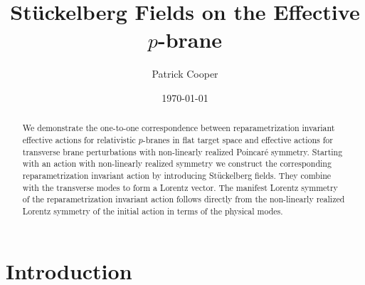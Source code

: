 \documentclass[%
 reprint,
 amsmath,amssymb,
 aps,
]{revtex4-1}
\begin{document}
\title{St\"uckelberg Fields on the Effective $p$-brane}

\author{Patrick Cooper}

\date{\today}

\begin{abstract}
We   demonstrate the one-to-one correspondence between reparametrization invariant effective actions for relativistic  $p$-branes
in flat target space and effective actions for transverse brane perturbations with non-linearly realized Poincar\'e symmetry.
Starting with an action with non-linearly realized symmetry we construct the corresponding reparametrization invariant action by introducing
St\"uckelberg fields. They combine with the transverse modes to form a Lorentz vector. The manifest Lorentz symmetry of the reparametrization invariant action
follows directly from the non-linearly realized Lorentz symmetry of the initial action in terms of the physical modes.
\end{abstract}

\maketitle


\section{\label{sec:level1}Introduction}
\end{document}
